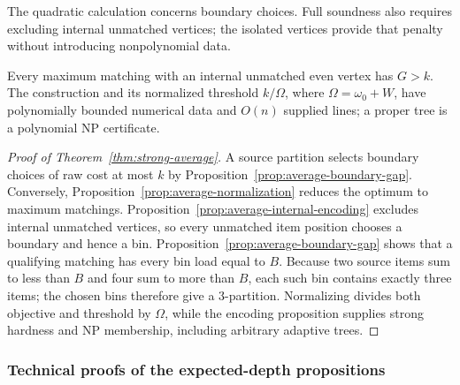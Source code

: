 The quadratic calculation concerns boundary choices. Full soundness
also requires excluding internal unmatched vertices; the isolated
vertices provide that penalty without introducing nonpolynomial data.

\begin{proposition}
\label{prop:average-internal-encoding}
Every maximum matching with an internal unmatched even vertex has
$G>k$. The construction and its normalized threshold $k/\Omega$,
where $\Omega=\omega_0+W$, have polynomially bounded numerical data
and $O(n)$ supplied lines; a proper tree is a polynomial NP certificate.
\end{proposition}

\begin{proof}[Proof of Theorem~\ref{thm:strong-average}]
A source partition selects boundary choices of raw cost at most $k$
by Proposition~\ref{prop:average-boundary-gap}. Conversely,
Proposition~\ref{prop:average-normalization} reduces the optimum to
maximum matchings. Proposition~\ref{prop:average-internal-encoding}
excludes internal unmatched vertices, so every unmatched item position
chooses a boundary and hence a bin. Proposition~\ref{prop:average-boundary-gap}
shows that a qualifying matching has every bin load equal to $B$.
Because two source items sum to less than $B$ and four sum to more than
$B$, each such bin contains exactly three items; the chosen bins
therefore give a 3-partition. Normalizing divides both objective and
threshold by $\Omega$, while the encoding proposition supplies strong
hardness and NP membership, including arbitrary adaptive trees.
\end{proof}

\subsubsection{Technical proofs of the expected-depth propositions}

